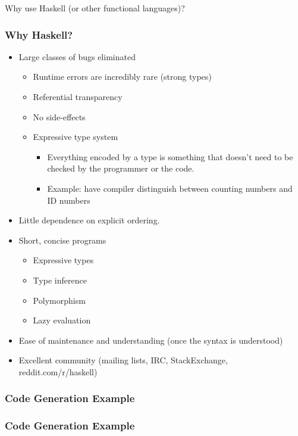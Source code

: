 \begin{frame}
  Why use Haskell (or other functional languages)?
\end{frame}

\begin{frame}
  \frametitle{Why Haskell?}
  \begin{itemize}[<+->]
    \item Large classes of bugs eliminated
      \begin{itemize}[<+->]
        \item Runtime errors are incredibly rare (strong types)
        \item Referential transparency
        \item No side-effects
        \item Expressive type system 
          \begin{itemize}[<+->]
            \item Everything encoded by a type is something that doesn't need to be
                  checked by the programmer or the code.
            \item Example: have compiler distinguish between counting numbers and ID numbers
          \end{itemize}
      \end{itemize}
    \item Little dependence on explicit ordering.
    \item Short, concise programs
      \begin{itemize}[<+->]
        \item Expressive types
        \item Type inference
        \item Polymorphism
        \item Lazy evaluation %
      \end{itemize}
    \item Ease of maintenance and understanding (once the syntax is understood)
    \item Excellent community (mailing lists, IRC, StackExchange, reddit.com/r/haskell)
  \end{itemize}
\end{frame}

\begin{frame}
  \frametitle{Code Generation Example}
  \scriptsize
  
\end{frame}

\begin{frame}
  \frametitle{Code Generation Example}
  \scriptsize
  
\end{frame}

